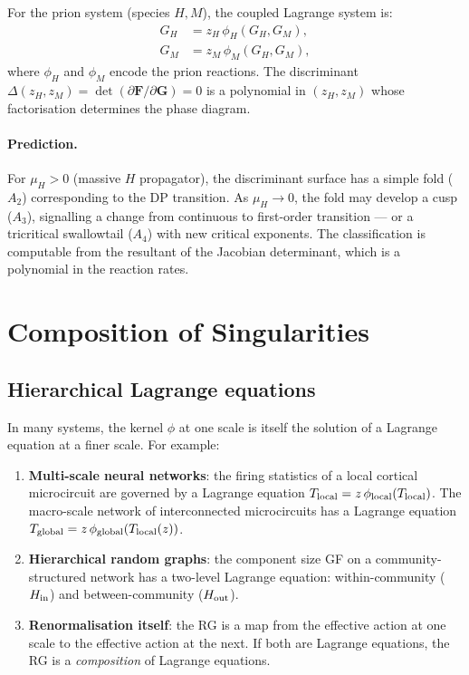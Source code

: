 \documentclass[11pt,a4paper]{article}
\theoremstyle{definition}
\begin{document}
For the prion system (species $H, M$), the coupled Lagrange system is:
\begin{align}
G_H &= z_H\,\phi_H(G_H, G_M), \\
G_M &= z_M\,\phi_M(G_H, G_M),
\end{align}
where $\phi_H$ and $\phi_M$ encode the prion reactions. The discriminant
$\Delta(z_H, z_M) = \det(\partial \mathbf{F}/\partial \mathbf{G}) = 0$
is a polynomial in $(z_H, z_M)$ whose factorisation determines the phase
diagram.

\paragraph{Prediction.}
For $\mu_H > 0$ (massive $H$ propagator), the discriminant surface has a
simple fold ($A_2$) corresponding to the DP transition. As $\mu_H \to 0$,
the fold may develop a cusp ($A_3$), signalling a change from continuous
to first-order transition --- or a tricritical swallowtail ($A_4$) with
new critical exponents. The classification is computable from the
resultant of the Jacobian determinant, which is a polynomial in the
reaction rates.


\section{Composition of Singularities}
\label{sec:composition}

\subsection{Hierarchical Lagrange equations}

In many systems, the kernel $\phi$ at one scale is itself the solution
of a Lagrange equation at a finer scale. For example:

\begin{enumerate}[leftmargin=2em]
\item \textbf{Multi-scale neural networks}: the firing statistics of a
local cortical microcircuit are governed by a Lagrange equation
$T_{\rm local} = z\,\phi_{\rm local}(T_{\rm local})$. The macro-scale
network of interconnected microcircuits has a Lagrange equation
$T_{\rm global} = z\,\phi_{\rm global}(T_{\rm local}(z))$.

\item \textbf{Hierarchical random graphs}: the component size GF on a
community-structured network has a two-level Lagrange equation:
within-community ($H_{\rm in}$) and between-community ($H_{\rm out}$).

\item \textbf{Renormalisation itself}: the RG is a map from the
effective action at one scale to the effective action at the next.
If both are Lagrange equations, the RG is a \emph{composition} of
Lagrange equations.
\end{enumerate}
\end{document}
